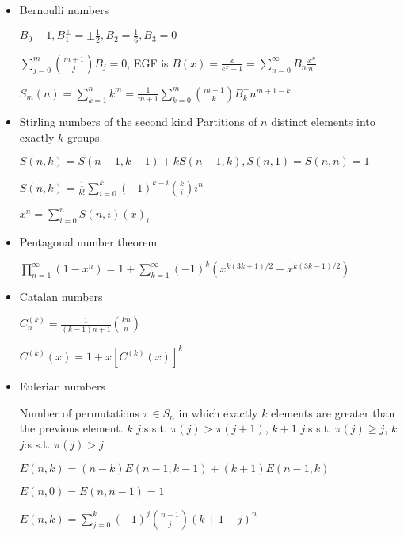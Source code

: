 \begin{itemize}
\item Bernoulli numbers

$B_0-1,B_1^{\pm}=\pm\frac{1}{2},B_2=\frac{1}{6},B_3=0$

$\displaystyle\sum_{j=0}^m\binom{m+1}{j}B_j=0$, EGF is $B(x) = \frac{x}{e^x - 1}=\displaystyle\sum_{n=0}^\infty B_n\frac{x^n}{n!}$.

$S_m(n)=\displaystyle\sum_{k=1}^nk^m=\frac{1}{m+1}\sum_{k=0}^m\binom{m+1}{k}B^{+}_kn^{m+1-k}$

\item Stirling numbers of the second kind
Partitions of $n$ distinct elements into exactly $k$ groups. 

$S(n, k) = S(n - 1, k - 1) + kS(n - 1, k), S(n, 1) = S(n, n) = 1$

$S(n, k) = \frac{1}{k!}\sum_{i=0}^{k}(-1)^{k-i}{k \choose i}i^n$

$x^n     = \sum_{i=0}^{n} S(n, i) (x)_i$

\item Pentagonal number theorem

$\displaystyle\prod_{n=1}^{\infty}(1-x^n)=1+\sum_{k=1}^{\infty}(-1)^k\left(x^{k(3k+1)/2} + x^{k(3k-1)/2}\right)$

\item Catalan numbers

$C^{(k)}_n = \displaystyle \frac{1}{(k - 1)n + 1}\binom{kn}{n}$

$C^{(k)}(x) = 1 + x [C^{(k)}(x)]^k$

\item Eulerian numbers

Number of permutations $\pi \in S_n$ in which exactly $k$ elements are greater than the previous element. $k$ $j$:s s.t. $\pi(j)>\pi(j+1)$, $k+1$ $j$:s s.t. $\pi(j)\geq j$, $k$ $j$:s s.t. $\pi(j)>j$.

$E(n,k) = (n-k)E(n-1,k-1) + (k+1)E(n-1,k)$

$E(n,0) = E(n,n-1) = 1$

$E(n,k) = \sum_{j=0}^k(-1)^j\binom{n+1}{j}(k+1-j)^n$

\end{itemize}

